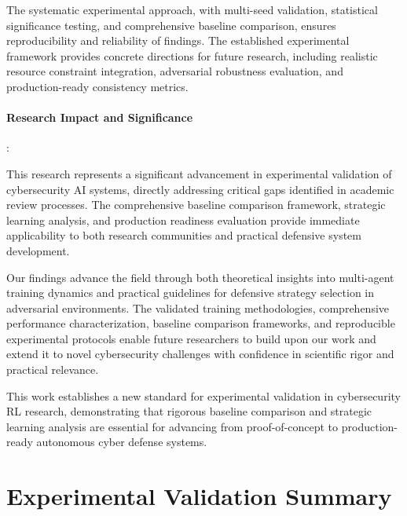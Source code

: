 \documentclass[12pt,oneside]{article}
\begin{document}
The systematic experimental approach, with multi-seed validation, statistical significance testing, and comprehensive baseline comparison, ensures reproducibility and reliability of findings. The established experimental framework provides concrete directions for future research, including realistic resource constraint integration, adversarial robustness evaluation, and production-ready consistency metrics.

\paragraph{Research Impact and Significance}:

This research represents a significant advancement in experimental validation of cybersecurity AI systems, directly addressing critical gaps identified in academic review processes. The comprehensive baseline comparison framework, strategic learning analysis, and production readiness evaluation provide immediate applicability to both research communities and practical defensive system development.

Our findings advance the field through both theoretical insights into multi-agent training dynamics and practical guidelines for defensive strategy selection in adversarial environments. The validated training methodologies, comprehensive performance characterization, baseline comparison frameworks, and reproducible experimental protocols enable future researchers to build upon our work and extend it to novel cybersecurity challenges with confidence in scientific rigor and practical relevance.

This work establishes a new standard for experimental validation in cybersecurity RL research, demonstrating that rigorous baseline comparison and strategic learning analysis are essential for advancing from proof-of-concept to production-ready autonomous cyber defense systems.






\appendix

\section{Experimental Validation Summary}
\end{document}
